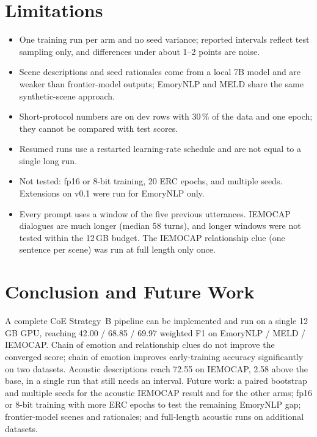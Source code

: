 \documentclass[lettersize,journal]{IEEEtran}
\begin{document}
\section{Limitations}
\begin{itemize}
\item One training run per arm and no seed variance; reported intervals reflect test sampling only, and differences under about 1--2 points are noise.
\item Scene descriptions and seed rationales come from a local 7B model and are weaker than frontier-model outputs; EmoryNLP and MELD share the same synthetic-scene approach.
\item Short-protocol numbers are on dev rows with 30\,\% of the data and one epoch; they cannot be compared with test scores.
\item Resumed runs use a restarted learning-rate schedule and are not equal to a single long run.
\item Not tested: fp16 or 8-bit training, 20 ERC epochs, and multiple seeds. Extensions on v0.1 were run for EmoryNLP only.
\item Every prompt uses a window of the five previous utterances. IEMOCAP dialogues are much longer (median 58 turns), and longer windows were not tested within the 12\,GB budget. The IEMOCAP relationship clue (one sentence per scene) was run at full length only once.

\end{itemize}

\section{Conclusion and Future Work}
A complete CoE Strategy~B pipeline can be implemented and run on a single 12\,GB GPU, reaching 42.00 / 68.85 / 69.97 weighted F1 on EmoryNLP / MELD / IEMOCAP. Chain of emotion and relationship clues do not improve the converged score; chain of emotion improves early-training accuracy significantly on two datasets. Acoustic descriptions reach 72.55 on IEMOCAP, 2.58 above the base, in a single run that still needs an interval. Future work: a paired bootstrap and multiple seeds for the acoustic IEMOCAP result and for the other arms; fp16 or 8-bit training with more ERC epochs to test the remaining EmoryNLP gap; frontier-model scenes and rationales; and full-length acoustic runs on additional datasets.



\end{document}

